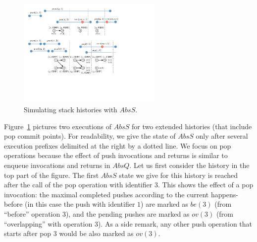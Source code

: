 \begin{figure}
\vspace{-8mm}
\includegraphics[width=7cm]{fig-stack.pdf}
%
\vspace{-5mm}
\caption{Simulating stack histories with $AbsS$.}
\label{fig:stackSim}
\vspace{-6mm}
\end{figure}
Figure~\ref{fig:stackSim} pictures two executions of $AbsS$ for two extended histories (that include pop commit points). For readability, we give the state of $AbsS$ only after several execution prefixes delimited at the right by a dotted line. We focus on pop operations because the effect of push invocations and returns is similar to enqueue invocations and returns in $AbsQ$. Let us first consider the history in the top part of the figure. The first $AbsS$ state we give for this history is reached after the call of the pop operation with identifier $3$. This shows the effect of a pop invocation: the maximal completed pushes according to the current happens-before (in this case the push with identifier $1$) are marked as $be(3)$ (from ``before'' operation 3), and the pending pushes are marked as $ov(3)$ (from ``overlapping'' with operation 3). As a side remark, any other push operation that starts after pop $3$ would be also marked as $ov(3)$.
